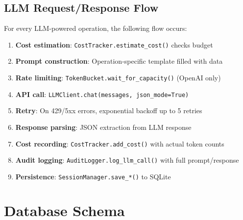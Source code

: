 \documentclass[11pt,a4paper]{article}
\begin{document}
\subsection{LLM Request/Response Flow}

For every LLM-powered operation, the following flow occurs:

\begin{enumerate}[nosep]
  \item \textbf{Cost estimation}: \texttt{CostTracker.estimate\_cost()} checks budget
  \item \textbf{Prompt construction}: Operation-specific template filled with data
  \item \textbf{Rate limiting}: \texttt{TokenBucket.wait\_for\_capacity()} (OpenAI only)
  \item \textbf{API call}: \texttt{LLMClient.chat(messages, json\_mode=True)}
  \item \textbf{Retry}: On 429/5xx errors, exponential backoff up to 5 retries
  \item \textbf{Response parsing}: JSON extraction from LLM response
  \item \textbf{Cost recording}: \texttt{CostTracker.add\_cost()} with actual token counts
  \item \textbf{Audit logging}: \texttt{AuditLogger.log\_llm\_call()} with full prompt/response
  \item \textbf{Persistence}: \texttt{SessionManager.save\_*()} to SQLite
\end{enumerate}

\section{Database Schema}
\end{document}
